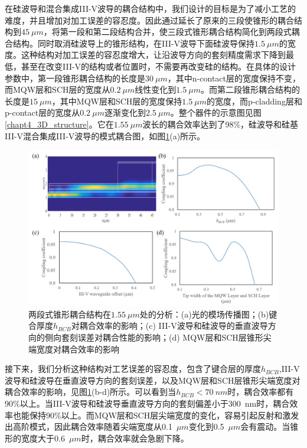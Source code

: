 在硅波导和混合集成III-V波导的耦合结构中，我们设计的目标是为了减小工艺的难度，并且增加对加工误差的容忍度。因此通过延长了原来的三段使锥形的耦合结构到$45~\mu m$，将第一段和第二段结构合并，使三段式锥形耦合结构简化到两段式耦合结构。同时取消硅波导上的锥形结构，在III-V波导下面硅波导保持$1.5~\mu m$的宽度。这种结构对加工误差的容忍度增大，让沿波导方向的套刻精度需求下降到最低，甚至在改变III-V的结构或者位置时，不需要再改变硅的结构。在具体的设计参数中，第一段锥形耦合结构的长度是$30~\mu m$，其中n-contact层的宽度保持不变，而MQW层和SCH层的宽度从$0.2~\mu m$线性变化到$1.5 ~\mu m$。而第二段锥形耦合结构的长度是$15~\mu m$，其中MQW层和SCH层的宽度保持$1.5~\mu m$的宽度，而p-cladding层和p-contact层的宽度从$0.2~\mu m$逐渐变化到$2.5~\mu m$。整个器件的示意图见图\ref{chapt4_3D_structure}。它在$1.55~\mu m$波长的耦合效率达到了98\%，硅波导和硅基III-V混合集成III-V波导的模式耦合图，如图\ref{chapt4_taper_performance}(a)所示。
\begin{figure}[h]
	\centering
	\includegraphics[width=14cm]{./Pictures/chapt4_taper_performance.jpg}
	\caption{两段式锥形耦合结构在$1.55~\mu m$处的分析：(a)光的模场传播图；(b)键合厚度$h_{BCB}$对耦合效率的影响；(c) III-V波导和硅波导的垂直波导方向的侧向套刻误差对耦合性能的影响；(d) MQW层和SCH层锥形尖端宽度对耦合效率的影响}
	\label{chapt4_taper_performance}
\end{figure}

接下来，我们分析这种结构对工艺误差的容忍度，包含了键合层的厚度$h_{BCB}$,III-V波导和硅波导在垂直波导方向的套刻误差，以及MQW层和SCH层锥形尖端宽度对耦合效率的影响，见图\ref{chapt4_taper_performance}(b-d)所示。可以看到当$h_{BCB} < 70 ~nm$时，耦合效率都有90\%以上。当III-V波导和硅波导垂直波导方向的套刻偏差小于300~nm时，耦合效率也能保持90\%以上。而MQW层和SCH层尖端宽度的变化，容易引起反射和激发出高阶模式，因此耦合效率随着尖端宽度从0.1~$\mu m$变化到0.5~$\mu m$会有震动。当锥形的宽度大于0.6~$\mu m$时，耦合效率就会急剧下降。

